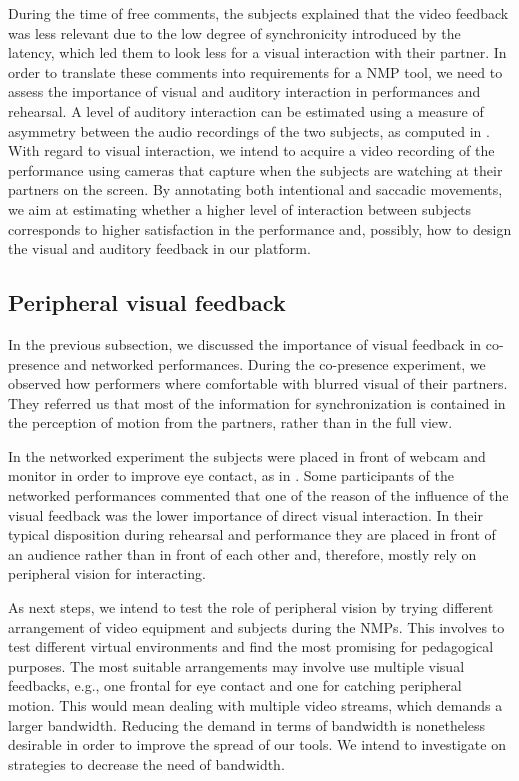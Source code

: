 During the time of free comments, the subjects explained that the video feedback was less relevant due to the low degree of synchronicity introduced by the latency, which led them to look less for a visual interaction with their partner. In order to translate these comments into requirements for a NMP tool, we need to assess the importance of visual and auditory interaction in performances and rehearsal. A level of auditory interaction can be estimated using a measure of asymmetry between the audio recordings of the two subjects, as computed in \cite{Chafe3}. With regard to visual interaction, we intend to acquire a video recording of the performance using cameras that capture when the subjects are watching at their partners on the screen. By annotating both intentional and saccadic movements, we aim at estimating whether a higher level of interaction between subjects corresponds to higher satisfaction in the performance and, possibly, how to design the visual and auditory feedback in our platform.
 
\subsection{Peripheral visual feedback}
In the previous subsection, we discussed the importance of visual feedback in co-presence and networked performances. During the co-presence experiment, we observed how performers where comfortable with blurred visual of their partners. They referred us that most of the information for synchronization is contained in the perception of motion from the partners, rather than in the full view.

In the networked experiment the subjects were placed in front of webcam and monitor in order to improve eye contact, as in \cite{duffy2017new}. Some participants of the networked performances commented that one of the reason of the influence of the visual feedback was the lower importance of direct visual interaction. In their typical disposition during rehearsal and performance they are placed in front of an audience rather than in front of each other and, therefore, mostly rely on peripheral vision for interacting.

As next steps, we intend to test the role of peripheral vision by trying different arrangement of video equipment and subjects during the NMPs. This involves to test different virtual environments and find the most promising for pedagogical purposes.  The most suitable arrangements may involve use multiple visual feedbacks, e.g., one frontal for eye contact and one for catching peripheral motion. This would mean dealing with multiple video streams, which demands a larger bandwidth. Reducing the demand in terms of bandwidth is nonetheless desirable in order to improve the spread of our tools. We intend to investigate on strategies to decrease the need of bandwidth.


